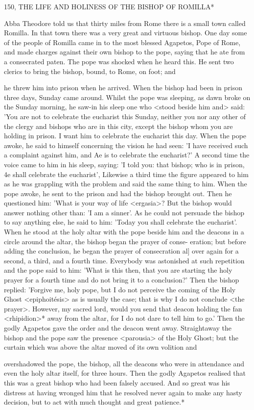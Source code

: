 150, THE LIFE AND HOLINESS
OF THE BISHOP OF ROMILLA*

Abba Theodore told us that thirty miles from Rome there is a small
town called Romilla. In that town there was a very great and
virtuous bishop. One day some of the people of Romilla came in to
the most blessed Agapetos, Pope of Rome, and made charges
against their own bishop to the pope, saying that he ate from a
consecrated paten. The pope was shocked when he heard this. He
sent two clerics to bring the bishop, bound, to Rome, on foot; and

he threw him into prison when he arrived. When the bishop had
been in prison three days, Sunday came around. Whilst the pope
was sleeping, as dawn broke on the Sunday morning, he saw-in his
sleep one who <stood beside him and> said: 'You are not to
celebrate the eucharist this Sunday, neither you nor any other of the
clergy and bishops who are in this city, except the bishop whom you
are holding in prison. I want him to celebrate the eucharist this day.
When the pope awoke, he said to himself concerning the vision he
had seen: 'I have received such a complaint against him, and Ae is
to celebrate the eucharist?' A second time the voice came to him in
his sleep, saying: 'I told you: that bishop; who is in prison, 4e shall
celebrate the eucharist', Likewise a third time the figure appeared to
him as he was grappling with the problem and said the same thing
to him. When the pope awoke, he sent to the prison and had the
bishop brought out. Then he questioned him: 'What is your way of
life <ergasia>? But the bishop would answer nothing other than: 'I
am a sinner'. As he could not persuade the bishop to say anything
else, he said to him: 'Today you shall celebrate the eucharist'. When
he stood at the holy altar with the pope beside him and the deacons
in a circle around the altar, the bishop began the prayer of conse-
eration; but before adding the conclusion, he began the prayer of
consecration al] over again for a second, a third, and a fourth time.
Everybody was astonished at such repetition and the pope said to
him: 'What is this then, that you are starting the holy prayer for a
fourth time and do not bring it to a conclusion?' Then the bishop
replied: 'Forgive me, holy pope, but I do not perceive the coming
of the Holy Ghost <epiphoitésis> as is usually the case; that is why
I do not conclude <the prayer>. However, my sacred lord, would
you send that deacon holding the fan <rhipidion>* away from the
altar, for I do not dare to tell him to go.' Then the godly Agapetos
gave the order and the deacon went away. Straightaway the bishop
and the pope saw the presence <parousia> of the Holy Ghost; but
the curtain which was above the altar moved of its own volition and

overshadowed the pope, the bishop, all the deacons who were in
attendance and even the holy altar itself, for three hours. Then the
godly Agapetos realised that this was a great bishop who had been
falsely accused. And so great was his distress at having wronged him
that he resolved never again to make any hasty decision, but to act
with much thought and great patience.*

